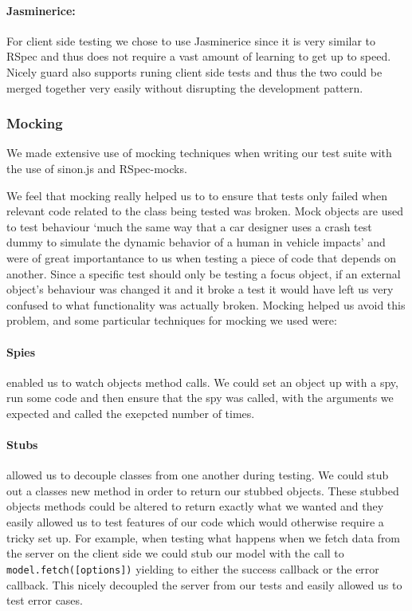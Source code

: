     \paragraph{Jasminerice:}
      For client side testing we chose to use Jasminerice since it is very similar to RSpec and thus does not require a vast amount of learning to get up to speed. Nicely guard also supports runing client side tests and thus the two could be merged together very easily without disrupting the development pattern.

  \subsubsection{Mocking}
    We made extensive use of mocking techniques when writing our test suite with the use of sinon.js\cite{sinon} and RSpec-mocks\cite{rspec_mocks}.

    We feel that mocking really helped us to to ensure that tests only failed when relevant code related to the class being tested was broken. Mock objects are used to test behaviour `much the same way that a car designer uses a crash test dummy to simulate the dynamic behavior of a human in vehicle impacts'\cite{mock_quote} and were of great importantance to us when testing a piece of code that depends on another.
    Since a specific test should only be testing a focus object, if an external object's behaviour was changed it and it broke a test it would have left us very confused to what functionality was actually broken. Mocking helped us avoid this problem, and some particular techniques for mocking we used were:
    
    \paragraph{Spies} enabled us to watch objects method calls. We could set an object up with a spy, run some code and then ensure that the spy was called, with the arguments we expected and called the exepcted number of times.

    \paragraph{Stubs} allowed us to decouple classes from one another during testing. We could stub out a classes new method in order to return our stubbed objects.
    These stubbed objects methods could be altered to return exactly what we wanted and they easily allowed us to test features of our code which would otherwise require a tricky set up.
    For example, when testing what happens when we fetch data from the server on the client side we could stub our model with the call to \verb!model.fetch([options])! yielding to either the success callback or the error callback.
    This nicely decoupled the server from our tests and easily allowed us to test error cases.




